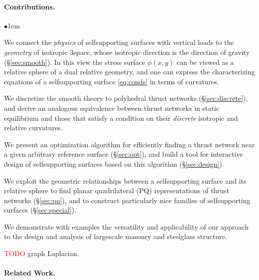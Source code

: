\documentclass[annual]{acmsiggraph}
\newcommand{\todo}[1]{\textcolor{red}{#1}}
\newcommand{\secref}[1]{(\S\ref{#1})}
\begin{document}
\paragraph{Contributions.}


\begin{list}{$\bullet$}{\itemindent1em}

\item We connect the \emph{physics} of self\dash supporting surfaces with 
vertical loads to the \emph{geometry} of isotropic 3\dash space, whose isotropic 
direction is the direction of gravity \secref{sec:smooth}. In this view 
the stress surface $\phi(x,y)$ can be viewed as a relative sphere of a 
dual relative geometry, and one can express the characterizing equations 
of a self\dash supporting surface \eqref{eq:conds} in terms of curvatures.

\item We discretize the smooth theory to polyhedral thrust networks 
\secref{sec:discrete}, and derive an analogous equivalence between thrust 
networks in static equilibrium and those that satisfy a condition on their 
\emph{discrete} isotropic and relative curvatures.

\item We present an optimization algorithm for efficiently finding a thrust network 
near a given arbitrary reference surface \secref{sec:opt}, and build a 
tool for interactive design of self\dash supporting surfaces based on this 
algorithm \secref{sec:design}.

\item We exploit the geometric relationships between a self\dash supporting surface 
and its relative sphere to find planar quadrilateral (PQ) representations 
of thrust networks \secref{sec:pq}, and to construct particularly nice 
families of self\dash supporting surfaces \secref{sec:special}.

\item We demonstrate with examples the versatility and applicability of 
our approach to the design and analysis of large\dash scale masonry and 
steel\dash glass structure.

\item \todo{TODO} graph Laplacian.

\end{list}

\paragraph{Related Work.}
\end{document}
